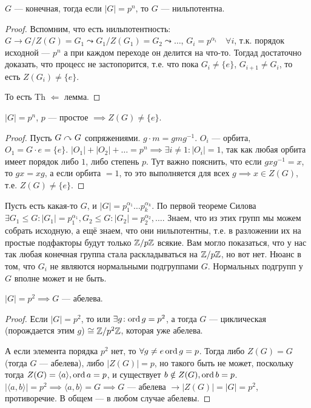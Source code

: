 \begin{theorem}
    $G$ --- конечная, тогда если $|G| = p^n$, то $G$ --- нильпотентна.
\end{theorem}
\begin{proof}
    Вспомним, что есть нильпотентность: $G \to G / Z(G) = G_1 \leadsto G_1 / Z(G_1) = G_2 \leadsto \ldots$, $G_i = p^{\alpha_i} \quad \forall i$, т.к. порядок исходной --- $p^n$ а при каждом переходе он делится на что-то. Тогдад достаточно доказать, что процесс не застопорится, т.е. что пока $G_i \neq \{e\}$, $G_{i+1} \neq G_i$, то есть $Z(G_i) \neq \{e\}$.

    То есть  Th  $\Leftarrow$  лемма.
\end{proof}
\begin{lemma}
    $|G| = p^n$,  $p$ --- простое  $\implies Z(G) \neq \{e\}$.
\end{lemma}
\begin{proof}
	Пусть $G \curvearrowright G$ сопряжениями. $g \cdot m = g m g^{-1}$.   $O_i$ --- орбита,  $O_1 = G \cdot e = \{e\}$.  $|O_1| + |O_2| + \ldots = p^n \implies \exists i \neq 1\!: |O_i| = 1$, так как любая орбита имеет порядок либо $1$, либо степень $p$. Тут важно пояснить, что если $gxg^{-1} = x$, то  $gx = xg$, а если орбита  $=1$, то это выполняется для всех  $g \implies x\in Z(G)$, т.е. $Z(G) \neq \{e\}$.
\end{proof}
\begin{remark}
    Пусть есть какая-то $G$, и $|G| = p_1^{\alpha_1} \ldots p_k^{\alpha_k}$. По первой теореме Силова $\exists G_1 \le G: |G_1| = p_1^{\alpha_1}, G_2 \le G : |G_2| = p_2^{\alpha_2}, \ldots$. Знаем, что из этих групп мы можем собрать исходную, а ещё знаем, что они нильпотентны, т.е. в разложении их на простые подфакторы будут только $\mathbb{Z} / p \mathbb{Z}$ всякие. Вам могло показаться, что у нас так любая конечная группа стала раскладываться на $\mathbb{Z} / p\mathbb{Z}$, но вот нет. Нюанс в том, что $G_i$ не являются нормальными подгруппами $G$. Нормальных подгрупп у $G$ вполне может и не быть.
\end{remark}
\begin{theorem}
    $|G| = p^2 \implies G$ --- абелева.
\end{theorem}
\begin{proof}
    Если $|G| = p^2$, то или $\exists g\!: \operatorname{ord} g =p^2$, а тогда $G$ --- циклическая (порождается этим $g$) $\cong \mathbb{Z} / p^2 \mathbb{Z}$, которая уже абелева.

    А если элемента порядка $p^2$ нет, то $\forall g \neq e \operatorname{ord} g = p$.  Тогда либо $Z(G) = G$ (тогда $G$ --- абелева), либо $|Z(G)| = p$, но такого быть не может, поскольку тогда  $Z(G) = \langle a \rangle, \operatorname{ord} a = p$, и существует $b \notin Z(G), \operatorname{ord} b = p$.  $|\langle a, b\rangle| = p^2 \implies \langle a, b \rangle = G \implies G$ --- абелева $\to |Z(G)| = |G| = p^2$, противоречие. В общем --- в любом случае абелевы.
\end{proof}
